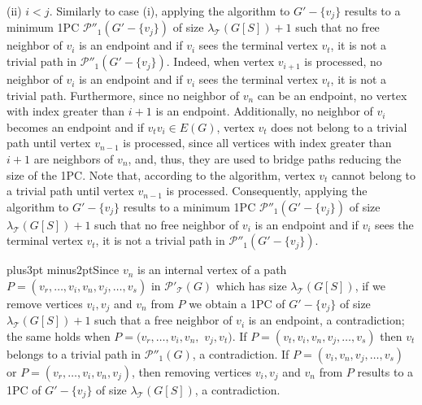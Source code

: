 \documentclass[10pt]{article}
\def\yskip{\penalty-50\vskip3pt plus3pt minus2pt}
\def\y{\yskip}
\begin{document}
{(ii) $i<j$. Similarly to case (i), applying the algorithm to
$G'-\{v_j\}$ results to a minimum 1PC
$\mathcal{P''}_1(G'-\{v_j\})$ of size
$\lambda_\mathcal{T}(G[S])+1$ such that no free neighbor of $v_i$
is an endpoint and if $v_i$ sees the terminal vertex $v_t$, it is
not a trivial path in $\mathcal{P''}_1(G'-\{v_j\})$. Indeed, when
vertex $v_{i+1}$ is processed, no neighbor of $v_i$ is an endpoint
and if $v_i$ sees the terminal vertex $v_t$, it is not a trivial
path. Furthermore, since no neighbor of $v_n$ can be an endpoint,
no vertex with index greater than $i+1$ is an endpoint.
Additionally, no neighbor of $v_i$ becomes an endpoint and if
$v_tv_i \in E(G)$, vertex $v_t$ does not belong to a trivial path
until vertex $v_{n-1}$ is processed, since all vertices with index
greater than $i+1$ are neighbors of $v_n$, and, thus, they are
used to bridge paths reducing the size of the 1PC. Note that,
according to the algorithm, vertex $v_t$ cannot belong to a
trivial path until vertex $v_{n-1}$ is processed. Consequently,
applying the algorithm to $G'-\{v_j\}$ results to a minimum 1PC
$\mathcal{P''}_1(G'-\{v_j\})$ of size
$\lambda_\mathcal{T}(G[S])+1$ such that no free neighbor of $v_i$
is an endpoint and if $v_i$ sees the terminal vertex $v_t$, it is
not a trivial path in $\mathcal{P''}_1(G'-\{v_j\})$.

\y Since $v_n$ is an internal vertex of a path $P=(v_r, \ldots,
v_i, v_n, v_j, \ldots, v_s)$ in $\mathcal{P'_{\mathcal{T}}}(G)$
which has size $\lambda_\mathcal{T}(G[S])$, if we remove vertices
$v_i, v_j$ and $v_n$ from $P$ we obtain a 1PC of $G'-\{v_j\}$ of
size $\lambda_\mathcal{T}(G[S])+1$ such that a free neighbor of
$v_i$ is an endpoint, a contradiction; the same holds when
$P=(v_r, \ldots, v_i, v_n,$ $v_j, v_t)$. If $P=(v_t, v_i, v_n,
v_j, \ldots, v_s)$ then $v_t$ belongs to a trivial path in
$\mathcal{P''}_1(G)$, a contradiction. If $P=(v_i, v_n, v_j,
\ldots, v_s)$ or $P=(v_r, \ldots, v_i, v_n, v_j)$, then removing
vertices $v_i, v_j$ and $v_n$ from $P$ results to a 1PC of
$G'-\{v_j\}$ of size $\lambda_\mathcal{T}(G[S])$, a contradiction.

}
\end{document}
